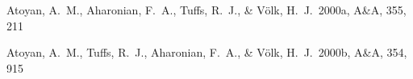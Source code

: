 \documentclass{PoS}
\newcommand\aap{A\&A}
\begin{document}
\begin{thebibliography}{99}





 Atoyan, A.~M., Aharonian, F.~A., Tuffs, R.~J., \& V{\"o}lk, H.~J.\ 2000a, \aap, 355, 211 

 Atoyan, A.~M., Tuffs, R.~J., Aharonian, F.~A., \& V{\"o}lk, H.~J.\ 2000b, \aap, 354, 915 

\end{thebibliography}
\end{document}
